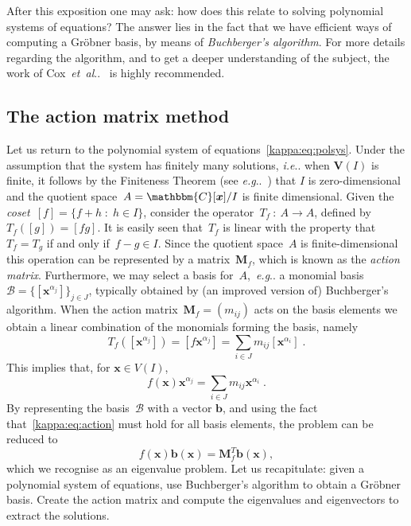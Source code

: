 \documentclass[11pt,a4paper]{article}
\makeatletter
\theoremstyle{definition}
\newcommand{\T}{T}
\newcommand{\mat}[1]{\bm{#1}}
\newcommand{\C}{\ensuremath{\mathbbm{C}}}
\DeclareRobustCommand\eg{\emph{e.g}\@ifnextchar.{}{.\@}}
\DeclareRobustCommand\etal{\emph{et~al}\@ifnextchar.{}{.\@}}
\DeclareRobustCommand\ie{\emph{i.e}\@ifnextchar.{}{.\@}}
\makeatother
\begin{document}
After this exposition one may ask: how does this relate to solving polynomial systems
of equations? The answer lies in the fact that we have efficient ways of computing
a Gröbner basis, by means of \emph{Buchberger's algorithm}.
For more details regarding the algorithm, and to get a deeper understanding of the subject,
the work of Cox~\etal{}~\cite{cox,cox2} is highly recommended.

\subsection{The action matrix method}\label{kappa:sec:actionmatrix}
Let us return to the polynomial system of equations~\eqref{kappa:eq:polsys}. Under the
assumption that the system has finitely many solutions, \ie{} when $\mat{V}(I)$ is finite,
it follows by the Finiteness Theorem (see \eg{}~\cite{cox2}) that $I$ is
zero-dimensional and the quotient space~\mbox{$A=\C[\mat{x}]/I$} is
finite dimensional. Given the \emph{coset}~$[f] = \{f+h\;:\;h\in I\}$,
consider the operator~\mbox{$T_f\::\:A\longrightarrow A$}, defined by~$T_f([g])=[fg]$.
It is easily seen that~$T_f$ is
linear with the property that~$T_f=T_g$ if and only if~$f-g\in I$.
Since the quotient space~$A$ is finite-dimensional this operation can be
represented by a matrix~$\mat{M}_f$, which is known as the \emph{action matrix}.
Furthermore, we may select a basis for~$A$,~\eg{} a monomial
basis~$\mathcal{B}=\{[\mat{x}^{\alpha_j}]\}_{j\in J}$,
typically obtained by (an improved version of)
Buchberger's algorithm.
When the action matrix~$\mat{M}_f=(m_{ij})$ acts on the basis elements we obtain a
linear combination of the monomials forming the basis, namely
\begin{equation}
    T_f([\mat{x}^{\alpha_j}]) = [f\mat{x}^{\alpha_j}]=\sum_{i\in J}m_{ij}[\mat{x}^{\alpha_i}]\;.
\end{equation}
This implies that,
for $\mat{x}\in V(I)$,
\begin{equation}\label{kappa:eq:action}
f(\mat{x})\mat{x}^{\alpha_j}=\sum_{i\in J}m_{ij}\mat{x}^{\alpha_i}\;.
\end{equation}
By representing the basis~$\mathcal{B}$ with a vector $\mat{b}$, and using the fact
that~\eqref{kappa:eq:action} must hold for all basis elements, the problem can be reduced to
\begin{equation}
f(\mat{x})\mat{b}(\mat{x}) = \mat{M}_f^{\T}\mat{b}(\mat{x}),
\end{equation}
which we recognise as an eigenvalue problem.
Let us recapitulate: given a polynomial
system of equations, use Buchberger's algorithm to obtain a Gröbner basis. Create the
action matrix and compute the eigenvalues and eigenvectors to extract the solutions.
\end{document}

